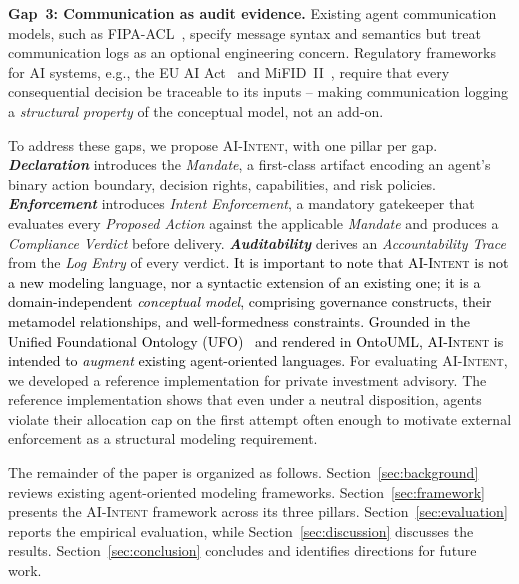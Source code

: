 \documentclass[runningheads]{llncs}
\begin{document}
\textbf{Gap~3: Communication as audit evidence.} Existing agent communication models, such as FIPA-ACL~\cite{fipa2002}, specify message syntax and semantics but treat communication logs as an optional engineering concern. Regulatory frameworks for AI systems, e.g., the EU AI Act~\cite{euaiact2024} and MiFID~II~\cite{mifid2014}, require that every consequential decision be traceable to its inputs -- making communication logging a \emph{structural property} of the conceptual model, not an add-on.

To address these gaps, we propose \textsc{AI-Intent}, with one pillar per gap. \textbf{\textit{Declaration}} introduces the \textit{Mandate}, a first-class artifact encoding an agent's binary action boundary, decision rights, capabilities, and risk policies. \textbf{\textit{Enforcement}} introduces \textit{Intent Enforcement}, a mandatory gatekeeper that evaluates every \textit{Proposed Action} against the applicable \textit{Mandate} and produces a \textit{Compliance Verdict} before delivery. \textbf{\textit{Auditability}} derives an \textit{Accountability Trace} from the \textit{Log Entry} of every verdict. \textcolor{black}{It is important to note that \textsc{AI-Intent} is not a new modeling language, nor a syntactic extension of an existing one; it is a domain-independent \emph{conceptual model}, comprising governance constructs, their metamodel relationships, and well-formedness constraints.
Grounded in the Unified Foundational Ontology (UFO)~\cite{guizzardi2005ontological} and rendered in OntoUML, \textsc{AI-Intent} is intended to \textit{augment} existing agent-oriented languages. }
For evaluating \textsc{AI-Intent}, we developed a reference implementation for private investment advisory. The reference implementation shows that even under a neutral disposition, agents violate their allocation cap on the first attempt often enough to motivate external enforcement as a structural modeling requirement.

The remainder of the paper is organized as follows. Section~\ref{sec:background}
reviews existing agent-oriented modeling frameworks. Section~\ref{sec:framework}
presents the \textsc{AI-Intent} framework across its three pillars. Section~\ref{sec:evaluation}
reports the empirical evaluation, while Section~\ref{sec:discussion}
discusses the results. Section~\ref{sec:conclusion} concludes and
identifies directions for future work.
\end{document}

